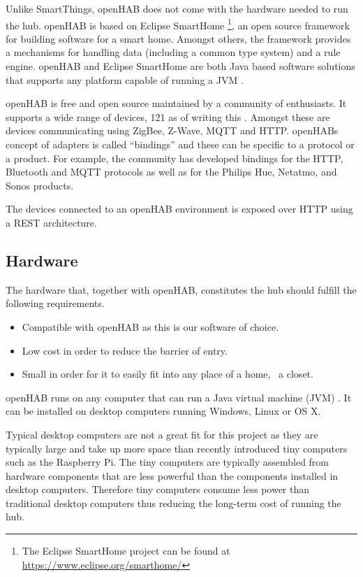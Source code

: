 Unlike SmartThings, openHAB \cite{OPENHAB} does not come with the hardware needed to run the hub.
openHAB is based on Eclipse SmartHome \footnote{The Eclipse SmartHome project can be found at \url{https://www.eclipse.org/smarthome/}}, an open source framework for building software for a smart home. Amongst others, the framework provides a mechanisms for handling data (including a common type system) and a rule engine.
openHAB and Eclipse SmartHome are both Java based software solutions that supports any platform capable of running a JVM \cite{openhab:introduction}.

openHAB is free and open source maintained by a community of enthusiasts. It supports a wide range of devices, 121 as of writing this \cite{openhab:supported-technologies}. Amongst these are devices communicating using ZigBee, Z-Wave, MQTT and HTTP. openHABs concept of adapters is called ``bindings'' and these can be specific to a protocol or a product. For example, the community has developed bindings for the HTTP, Bluetooth and MQTT protocols as well as for the Philips Hue, Netatmo, and Sonos products.

The devices connected to an openHAB environment is exposed over HTTP using a REST architecture.

\subsection{Hardware}

The hardware that, together with openHAB, constitutes the hub should fulfill the following requirements.

\begin{itemize}
\item Compatible with openHAB as this is our software of choice.
\item Low cost in order to reduce the barrier of entry.
\item Small in order for it to easily fit into any place of a home, \eg~a closet.
\end{itemize}

openHAB runs on any computer that can run a Java virtual machine (JVM) \cite{openhab:introduction}. It can be installed on desktop computers running Windows, Linux or OS X.

Typical desktop computers are not a great fit for this project as they are typically large and take up more space than recently introduced tiny computers such as the Raspberry Pi. The tiny computers are typically assembled from hardware components that are less powerful than the components installed in desktop computers. Therefore tiny computers consume less power than traditional desktop computers thus reducing the long-term cost of running the hub.

